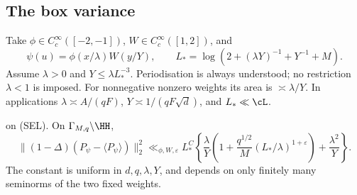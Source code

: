 \subsection*{The box variance}
Take \(\phi\in C_c^\infty([-2,-1])\), \(W\in C_c^\infty([1,2])\), and
\[
 \psi(u)=\phi(x/\lambda)W(y/Y),\qquad
 L_* =\log(2+(\lambda Y)^{-1}+Y^{-1}+M).
\]
Assume \(\lambda>0\) and \(Y\le\lambda L_*^{-3}\). Periodisation is always
understood; no restriction \(\lambda<1\) is imposed. For nonnegative
nonzero weights its area is \(\asymp\lambda/Y\). In applications
\(\lambda\asymp A/(qF)\), \(Y\asymp1/(qF\sqrt d)\), and \(L_*\ll\cL\).

\begin{proposition}\label{L:5.1}
 on (SEL). On \(\Gamma_{M,q}\backslash\HH\),
\begin{equation}\label{B:eq:variance}
 \|(1-\Delta)(P_\psi-\langle P_\psi\rangle)\|_2^2
 \ll_{\phi,W,\varepsilon}L_*^C
 \left\{\frac\lambda Y
   \left(1+\frac{q^{1/2}}M(L_*/\lambda)^{1+\varepsilon}\right)
       +\frac{\lambda^2}Y\right\}.
\end{equation}
The constant is uniform in \(d,q,\lambda,Y\), and depends on only finitely
many seminorms of the two fixed weights.
\end{proposition}
